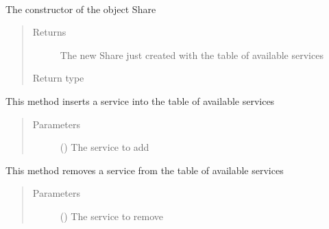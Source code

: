 \documentclass[a4paper,10pt,english,openany,oneside]{sphinxmanual}
\begin{document}
\begin{fulllineitems}
\label{\detokenize{code:Share}}~

\begin{fulllineitems}
\label{\detokenize{code:Share.new}}
The constructor of the object Share
\begin{quote}\begin{description}
\item[{Returns}] \leavevmode
The new Share just created with the table of available services

\item[{Return type}] \leavevmode
{\hyperref[\detokenize{code:Share}]{}}

\end{description}\end{quote}

\end{fulllineitems}


\begin{fulllineitems}
\label{\detokenize{code:Share.attach}}
This method inserts a service into the table of available services
\begin{quote}\begin{description}
\item[{Parameters}] \leavevmode
{} ({\hyperref[\detokenize{code:Service}]{}}) \textendash{} The service to add

\end{description}\end{quote}

\end{fulllineitems}


\begin{fulllineitems}
\label{\detokenize{code:Share.detach}}
This method removes a service from the table of available services
\begin{quote}\begin{description}
\item[{Parameters}] \leavevmode
{} ({\hyperref[\detokenize{code:Service}]{}}) \textendash{} The service to remove


\end{description}
\end{quote}
\end{fulllineitems}
\end{fulllineitems}
\end{document}
